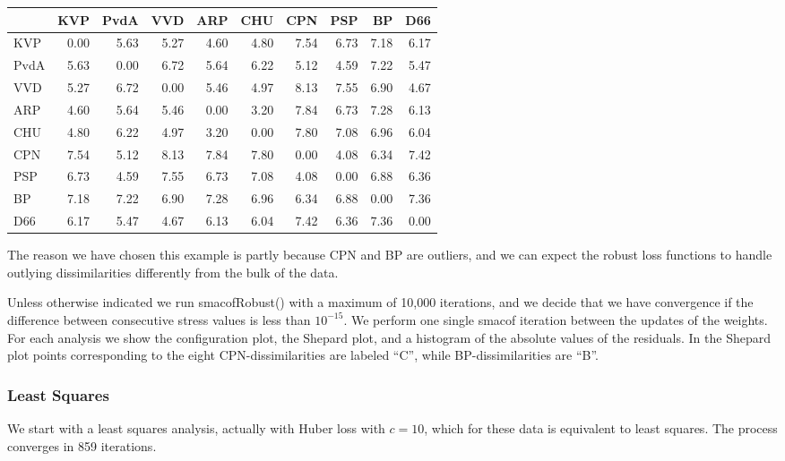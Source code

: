 \documentclass[
  12pt,
  letterpaper,
  DIV=11,
  numbers=noendperiod]{scrartcl}
\theoremstyle{plain}
\theoremstyle{plain}
\theoremstyle{plain}
\theoremstyle{definition}
\theoremstyle{remark}
\begin{document}
\begin{longtable}[]{@{}lrrrrrrrrr@{}}
\toprule\noalign{}
& KVP & PvdA & VVD & ARP & CHU & CPN & PSP & BP & D66 \\
\midrule\noalign{}
\endhead
\bottomrule\noalign{}
\endlastfoot
KVP & 0.00 & 5.63 & 5.27 & 4.60 & 4.80 & 7.54 & 6.73 & 7.18 & 6.17 \\
PvdA & 5.63 & 0.00 & 6.72 & 5.64 & 6.22 & 5.12 & 4.59 & 7.22 & 5.47 \\
VVD & 5.27 & 6.72 & 0.00 & 5.46 & 4.97 & 8.13 & 7.55 & 6.90 & 4.67 \\
ARP & 4.60 & 5.64 & 5.46 & 0.00 & 3.20 & 7.84 & 6.73 & 7.28 & 6.13 \\
CHU & 4.80 & 6.22 & 4.97 & 3.20 & 0.00 & 7.80 & 7.08 & 6.96 & 6.04 \\
CPN & 7.54 & 5.12 & 8.13 & 7.84 & 7.80 & 0.00 & 4.08 & 6.34 & 7.42 \\
PSP & 6.73 & 4.59 & 7.55 & 6.73 & 7.08 & 4.08 & 0.00 & 6.88 & 6.36 \\
BP & 7.18 & 7.22 & 6.90 & 7.28 & 6.96 & 6.34 & 6.88 & 0.00 & 7.36 \\
D66 & 6.17 & 5.47 & 4.67 & 6.13 & 6.04 & 7.42 & 6.36 & 7.36 & 0.00 \\
\end{longtable}

The reason we have chosen this example is partly because CPN and BP are
outliers, and we can expect the robust loss functions to handle outlying
dissimilarities differently from the bulk of the data.

Unless otherwise indicated we run smacofRobust() with a maximum of
10,000 iterations, and we decide that we have convergence if the
difference between consecutive stress values is less than
\ensuremath{10^{-15}}. We perform one single smacof iteration between
the updates of the weights. For each analysis we show the configuration
plot, the Shepard plot, and a histogram of the absolute values of the
residuals. In the Shepard plot points corresponding to the eight
CPN-dissimilarities are labeled ``C'', while BP-dissimilarities are
``B''.

\subsubsection{Least Squares}\label{least-squares}

We start with a least squares analysis, actually with Huber loss with
\(c=10\), which for these data is equivalent to least squares. The
process converges in 859 iterations.
\end{document}
